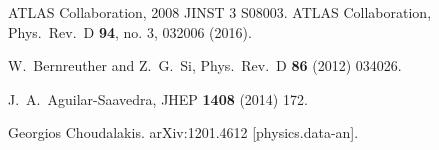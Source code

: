 \documentclass[12pt]{article}
\begin{document}
\begin{thebibliography}{99}

ATLAS Collaboration, 2008 JINST 3 S08003. 
  ATLAS Collaboration,
  Phys.\ Rev.\ D {\bf 94}, no. 3, 032006 (2016).



  W.~Bernreuther and Z.~G.~Si,
  Phys.\ Rev.\ D {\bf 86} (2012) 034026.


  J.~A.~Aguilar-Saavedra,
  JHEP {\bf 1408} (2014) 172.

Georgios Choudalakis.  arXiv:1201.4612 [physics.data-an].


\end{thebibliography}

 
\end{document}
